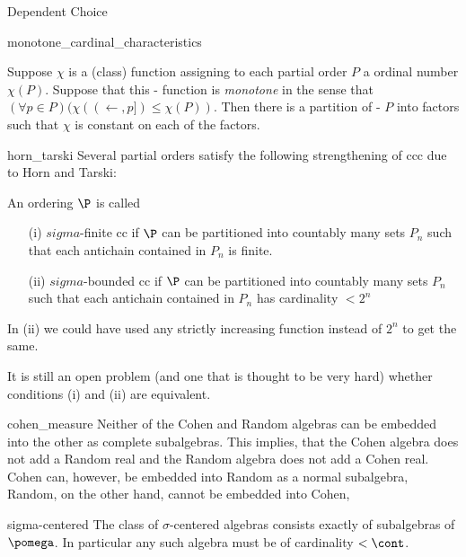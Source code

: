 \begin{exercise}{Dependent Choice}
\end{exercise}

\begin{exercise}{monotone_cardinal_characteristics}
\begin{prop} Suppose $\chi$ is a (class) function assigning to each partial order $P$ a ordinal number $\chi(P)$. Suppose that this
-                     function is \emph{monotone} in the sense that $(\forall p\in P)(\chi((\leftarrow,p])\leq\chi(P))$. Then there is a partition of
-                     $P$ into factors such that $\chi$ is constant on each of the factors.
\end{prop}
\end{exercise}
\begin{exercise}{horn_tarski}
Several partial orders satisfy the following strengthening of ccc due to Horn and Tarski:
\begin{definition} An ordering $\P$ is called
\begin{itemize}
 \item [(i)] $sigma$-finite cc if $\P$ can be partitioned into countably many sets $P_n$ such that each antichain contained in $P_n$ is finite.
 \item [(ii)] $sigma$-bounded cc if $\P$ can be partitioned into countably many sets $P_n$ such that each antichain contained in $P_n$
              has cardinality $<2^n$
\end{itemize}
\begin{note} In (ii) we could have used any strictly increasing function instead of $2^n$ to get the same.
\end{note}

It is still an open problem (and one that is thought to be very hard) whether conditions (i) and (ii) are equivalent.
\end{definition}
\end{exercise}

\begin{exercise}{cohen_measure}
 Neither of the Cohen and Random algebras can be embedded into the other as complete subalgebras. This implies, that
 the Cohen algebra does not add a Random real and the Random algebra does not add a Cohen real. Cohen can, however,
 be embedded into Random as a normal subalgebra, Random, on the other hand, cannot be embedded into Cohen,
\end{exercise}

\begin{exercise}{sigma-centered}
 The class of $\sigma$-centered algebras consists exactly of subalgebras of $\pomega$. In particular any such algebra
 must be of cardinality $<\cont$.
\end{exercise}

